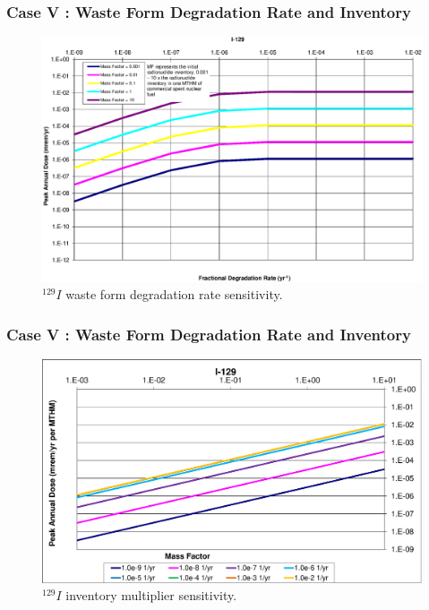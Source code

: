 \begin{frame}[c]
  \frametitle{Case V : Waste Form Degradation Rate and Inventory}
\begin{figure}[ht!]
\centering
\includegraphics[width=\linewidth]{WFDegAndInv/I-129.eps}
\caption{$^{129}I$ waste form degradation rate sensitivity.}
\label{fig:WFDegI129}
\end{figure}
\end{frame}

\begin{frame}[c]
  \frametitle{Case V : Waste Form Degradation Rate and Inventory}

\begin{figure}[ht!]
\centering
\includegraphics[width=\linewidth]{WFDegAndInv/I-129-MF.eps}
\caption{$^{129}I$ inventory multiplier sensitivity.}
\label{fig:WFDegI129MF}
\end{figure}
\end{frame}

